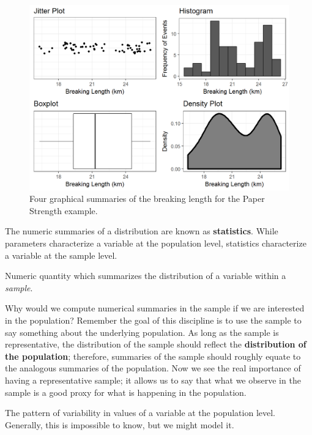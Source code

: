 \documentclass[]{book}
\theoremstyle{definition}
\theoremstyle{definition}
\theoremstyle{remark}
\let\BeginKnitrBlock\begin \let\EndKnitrBlock\end
\begin{document}
\begin{figure}

{\centering \includegraphics[width=0.8\linewidth]{./Images/summaries-univariate-1} 

}

\caption{Four graphical summaries of the breaking length for the Paper Strength example.}\label{fig:summaries-univariate}
\end{figure}

The numeric summaries of a distribution are known as
\textbf{statistics}. While parameters characterize a variable at the
population level, statistics characterize a variable at the sample
level.

\BeginKnitrBlock{definition}[Statistic]
\protect\hypertarget{def:defn-statistic}{}{\label{def:defn-statistic}
{} }Numeric quantity which summarizes the
distribution of a variable within a \emph{sample}.
\EndKnitrBlock{definition}

Why would we compute numerical summaries in the sample if we are
interested in the population? Remember the goal of this discipline is to
use the sample to say something about the underlying population. As long
as the sample is representative, the distribution of the sample should
reflect the \textbf{distribution of the population}; therefore,
summaries of the sample should roughly equate to the analogous summaries
of the population. Now we see the real importance of having a
representative sample; it allows us to say that what we observe in the
sample is a good proxy for what is happening in the population.

\BeginKnitrBlock{definition}[Distribution of the Population]
\protect\hypertarget{def:defn-distribution-population}{}{\label{def:defn-distribution-population}
{} }The pattern of
variability in values of a variable at the population level. Generally,
this is impossible to know, but we might model it.
\EndKnitrBlock{definition}
\end{document}

